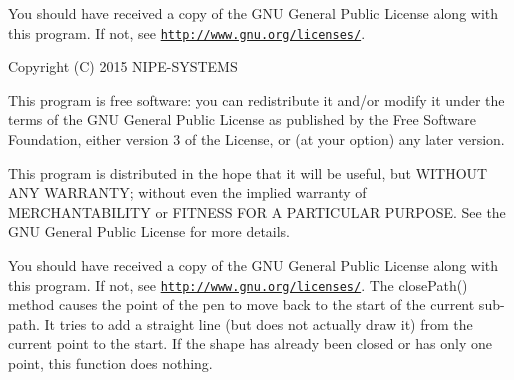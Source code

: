 You should have received a copy of the G\+N\+U General Public License along with this program. If not, see \href{http://www.gnu.org/licenses/}{\tt http\+://www.\+gnu.\+org/licenses/}.

Copyright (C) 2015 N\+I\+P\+E-\/\+S\+Y\+S\+T\+E\+M\+S

This program is free software\+: you can redistribute it and/or modify it under the terms of the G\+N\+U General Public License as published by the Free Software Foundation, either version 3 of the License, or (at your option) any later version.

This program is distributed in the hope that it will be useful, but W\+I\+T\+H\+O\+U\+T A\+N\+Y W\+A\+R\+R\+A\+N\+T\+Y; without even the implied warranty of M\+E\+R\+C\+H\+A\+N\+T\+A\+B\+I\+L\+I\+T\+Y or F\+I\+T\+N\+E\+S\+S F\+O\+R A P\+A\+R\+T\+I\+C\+U\+L\+A\+R P\+U\+R\+P\+O\+S\+E. See the G\+N\+U General Public License for more details.

You should have received a copy of the G\+N\+U General Public License along with this program. If not, see \href{http://www.gnu.org/licenses/}{\tt http\+://www.\+gnu.\+org/licenses/}. The close\+Path() method causes the point of the pen to move back to the start of the current sub-\/path. It tries to add a straight line (but does not actually draw it) from the current point to the start. If the shape has already been closed or has only one point, this function does nothing. 